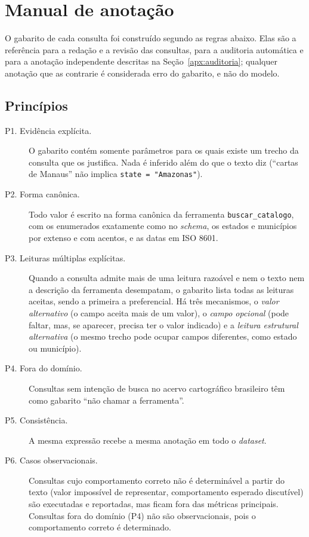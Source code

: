 \section{Manual de anotação}
\label{apx:manual}

O gabarito de cada consulta foi construído segundo as regras abaixo. Elas são a referência para a redação e a revisão das consultas, para a auditoria automática e para a anotação independente descritas na Seção~\ref{apx:auditoria}; qualquer anotação que as contrarie é considerada erro do gabarito, e não do modelo.

\subsection*{Princípios}

\begin{description}
  \item[P1. Evidência explícita.] O gabarito contém somente parâmetros para os quais existe um trecho da consulta que os justifica. Nada é inferido além do que o texto diz (``cartas de Manaus'' não implica \texttt{state = "Amazonas"}).
  \item[P2. Forma canônica.] Todo valor é escrito na forma canônica da ferramenta \texttt{buscar\_catalogo}, com os enumerados exatamente como no \textit{schema}, os estados e municípios por extenso e com acentos, e as datas em ISO 8601.
  \item[P3. Leituras múltiplas explícitas.] Quando a consulta admite mais de uma leitura razoável e nem o texto nem a descrição da ferramenta desempatam, o gabarito lista todas as leituras aceitas, sendo a primeira a preferencial. Há três mecanismos, o \emph{valor alternativo} (o campo aceita mais de um valor), o \emph{campo opcional} (pode faltar, mas, se aparecer, precisa ter o valor indicado) e a \emph{leitura estrutural alternativa} (o mesmo trecho pode ocupar campos diferentes, como estado ou município).
  \item[P4. Fora do domínio.] Consultas sem intenção de busca no acervo cartográfico brasileiro têm como gabarito ``não chamar a ferramenta''.
  \item[P5. Consistência.] A mesma expressão recebe a mesma anotação em todo o \textit{dataset}.
  \item[P6. Casos observacionais.] Consultas cujo comportamento correto não é determinável a partir do texto (valor impossível de representar, comportamento esperado discutível) são executadas e reportadas, mas ficam fora das métricas principais. Consultas fora do domínio (P4) não são observacionais, pois o comportamento correto é determinado.
\end{description}

